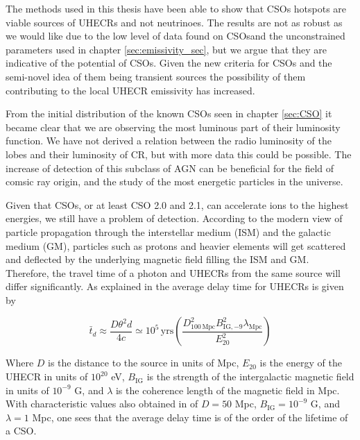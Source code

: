 
The methods used in this thesis have been able to show that CSOs hotspots are viable sources of UHECRs and not neutrinoes. The results are not as robust as we would like due to the low level of data found on CSOsand the unconstrained parameters used in chapter \ref{sec:emissivity_sec}, but we argue that they are indicative of the potential of CSOs. Given the new criteria for CSOs and the semi-novel idea of them being transient sources the possibility of them contributing to the local UHECR 
emissivity has increased. 

From the initial distribution of the known CSOs seen in chapter \ref{sec:CSO} it became clear that we are observing the most luminous part of their luminosity function. We have not derived a relation between the radio luminosity of the lobes and their luminosity of CR, but with more data this could be possible. The increase of detection of this subclass of AGN can be beneficial for the field of comsic ray origin, and the study of the most energetic particles in the universe. 

Given that CSOs, or at least CSO 2.0 and 2.1, can accelerate ions to the highest energies, we still have a problem of detection. According to the modern view of particle propagation through the interstellar medium (ISM) and the galactic medium (GM), particles such as protons and heavier elements will get scattered and deflected by the underlying magnetic field filling the ISM and GM. Therefore, the travel time of a photon and UHECRs from the same source will differ significantly.
As explained in \cite{Murase_2008} the average delay time for UHECRs is given by

\begin{equation}
    \bar{t}_d \approx \frac{D \theta^2 d}{4c} \simeq 10^5 \, \text{yrs} \left( \frac{D^2_{100 \, \text{Mpc}} B^2_{\text{IG},-9} \lambda_{\text{Mpc}}} {E_{20}^2}\right)
\end{equation}

Where $D$ is the distance to the source in units of Mpc, $E_{20}$ is the energy of the UHECR in units of $10^{20}$ eV, $B_{\text{IG}}$ is the strength of the intergalactic magnetic field in units of $10^{-9}$ G, and $\lambda$ is the coherence length of the magnetic field in Mpc. With characteristic values also obtained in \cite{Murase_2008} of $D = 50$ Mpc, $B_{\text{IG}} = 10^{-9}$ G, and $\lambda = 1$ Mpc, one sees that the average delay time is of the order of the lifetime of a CSO. 

